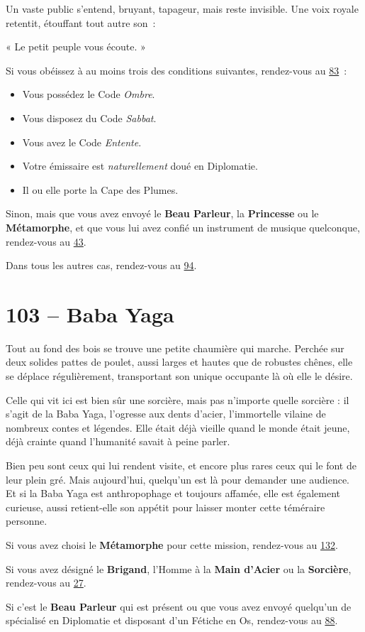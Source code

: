 \documentclass{report}
\newcommand{\gsection}[1]{
    \section{#1}
    \label{section-#1}
}
\newcommand{\glink}[1]{\hyperref[section-#1]{#1}}
\newcommand{\hero}[1]{\textbf{#1}}
\begin{document}
Un vaste public s'entend, bruyant, tapageur, mais reste invisible. Une voix royale retentit, étouffant tout autre son :

« Le petit peuple vous écoute. »

Si vous obéissez à au moins trois des conditions suivantes, rendez-vous au \glink{83} :
\begin{itemize}
\item Vous possédez le Code \emph{Ombre}.
\item Vous disposez du Code \emph{Sabbat}.
\item Vous avez le Code \emph{Entente}.
\item Votre émissaire est \emph{naturellement} doué en Diplomatie.
\item Il ou elle porte la Cape des Plumes.
\end{itemize}

Sinon, mais que vous avez envoyé le \hero{Beau Parleur}, la \hero{Princesse} ou le \hero{Métamorphe}, et que vous lui avez confié un instrument de musique quelconque, rendez-vous au \glink{43}.

Dans tous les autres cas, rendez-vous au \glink{94}.

\gsection{103 – Baba Yaga}

Tout au fond des bois se trouve une petite chaumière qui marche. Perchée sur deux solides pattes de poulet, aussi larges et hautes que de robustes chênes, elle se déplace régulièrement, transportant son unique occupante là où elle le désire.

Celle qui vit ici est bien sûr une sorcière, mais pas n'importe quelle sorcière : il s'agit de la Baba Yaga, l'ogresse aux dents d'acier, l'immortelle vilaine de nombreux contes et légendes. Elle était déjà vieille quand le monde était jeune, déjà crainte quand l'humanité savait à peine parler.

Bien peu sont ceux qui lui rendent visite, et encore plus rares ceux qui le font de leur plein gré. Mais aujourd'hui, quelqu'un est là pour demander une audience. Et si la Baba Yaga est anthropophage et toujours affamée, elle est également curieuse, aussi retient-elle son appétit pour laisser monter cette téméraire personne.

Si vous avez choisi le \hero{Métamorphe} pour cette mission, rendez-vous au \glink{132}.

Si vous avez désigné le \hero{Brigand}, l'Homme à la \hero{Main d'Acier} ou la \hero{Sorcière}, rendez-vous au \glink{27}.

Si c'est le \hero{Beau Parleur} qui est présent ou que vous avez envoyé quelqu'un de spécialisé en Diplomatie et disposant d'un Fétiche en Os, rendez-vous au \glink{88}.
\end{document}

